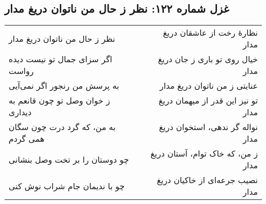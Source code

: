 \begin{center}
\section*{غزل شماره ۱۲۲: نظر ز حال من ناتوان دریغ مدار}
\label{sec:122}
\begin{longtable}{l p{0.5cm} r}
نظر ز حال من ناتوان دریغ مدار
&&
نظارهٔ رخت از عاشقان دریغ مدار
\\
اگر سزای جمال تو نیست دیده رواست
&&
خیال روی تو باری ز جان دریغ مدار
\\
به پرسش من رنجور اگر نمی‌آیی
&&
عنایتی ز من ناتوان دریغ مدار
\\
ز خوان وصل تو چون قانعم به دیداری
&&
تو نیز این قدر از میهمان دریغ مدار
\\
به من، که گرد درت چون سگان همی گردم
&&
نواله گر ندهی، استخوان دریغ مدار
\\
چو دوستان را بر تخت وصل بنشانی
&&
ز من، که خاک توام، آستان دریغ مدار
\\
چو با ندیمان جام شراب نوش کنی
&&
نصیب جرعه‌ای از خاکیان دریغ مدار
\\
\end{longtable}
\end{center}

